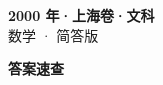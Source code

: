 \documentclass[zihao=-4, a4paper]{ctexart}
\begin{document}
\begin{center}
  {\Large\bfseries 2000 年·上海卷·文科}\\[4pt]
  {\large 数学 · 简答版}
\end{center}
\medskip
{}

\clearpage
{}
\begin{center}{\Large\bfseries 答案速查}\end{center}
\medskip

\end{document}
